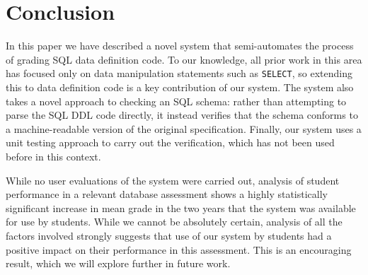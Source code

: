 \documentclass[sigconf, authordraft, capitalise]{acmart}
\begin{document}
\section{Conclusion}
\label{sec-conclusion}

In this paper we have described a novel system that semi-automates the process of grading SQL data definition code. To our knowledge, all prior work in this area has focused only on data manipulation statements such as \texttt{SELECT}, so extending this to data definition code is a key contribution of our system. The system also takes a novel approach to checking an SQL schema: rather than attempting to parse the SQL DDL code directly, it instead verifies that the schema conforms to a machine-readable version of the original specification. Finally, our system uses a unit testing approach to carry out the verification, which has not been used before in this context.

While no user evaluations of the system were carried out, analysis of student performance in a relevant database assessment shows a highly statistically significant increase in mean grade in the two years that the system was available for use by students. While we cannot be absolutely certain, analysis of all the factors involved strongly suggests that use of our system by students had a positive impact on their performance in this assessment. This is an encouraging result, which we will explore further in future work.




\end{document}
